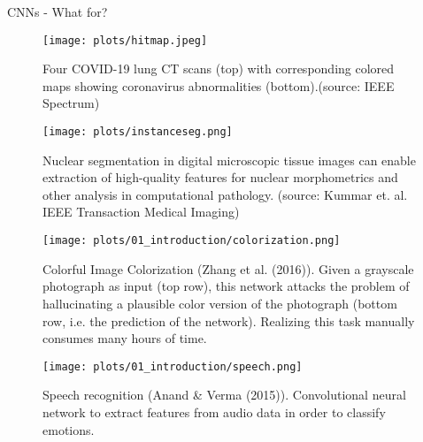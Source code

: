 \begin{vbframe}{CNNs - What for?}
   \begin{figure}
    \centering
    \texttt{[image: plots/hitmap.jpeg]}
    \caption{Four COVID-19 lung CT scans (top) with corresponding colored maps showing coronavirus abnormalities (bottom).(source: IEEE Spectrum)}
  \end{figure}
\framebreak

  \begin{figure}
    \centering
    \texttt{[image: plots/instanceseg.png]}
    \caption{Nuclear segmentation in digital microscopic tissue images can enable extraction of high-quality features for nuclear morphometrics and other analysis in computational pathology. (source: Kummar et. al. IEEE Transaction Medical Imaging) }
  \end{figure}
\framebreak

  \begin{figure}
    \centering
    \texttt{[image: plots/01\_introduction/colorization.png]}
    \caption{Colorful Image Colorization (Zhang et al. (2016)). Given a grayscale photograph as input (top row), this network attacks the problem of hallucinating a plausible color version of the photograph (bottom row, i.e. the prediction of the network). Realizing this task manually consumes many hours of time.}
  \end{figure}
\framebreak


  \begin{figure}
    \centering
    \texttt{[image: plots/01\_introduction/speech.png]}
    \caption{Speech recognition (Anand \& Verma (2015)). Convolutional neural network to extract features from audio data in order to classify emotions.}
  \end{figure}
\end{vbframe}


\endlecture

